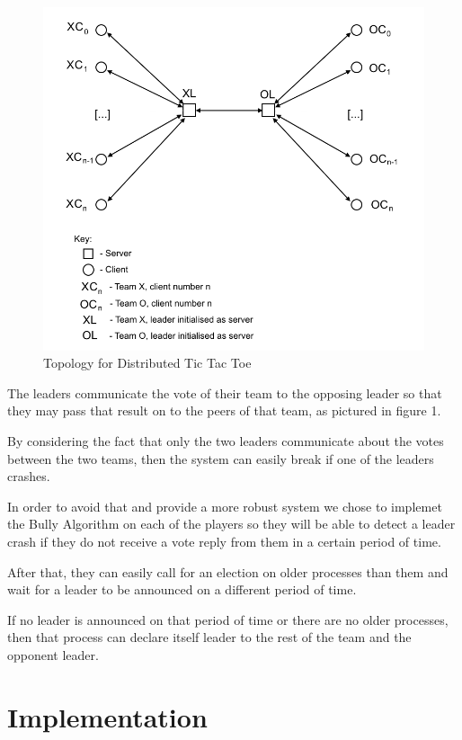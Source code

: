 \documentclass[conference]{IEEEtran}
\begin{document}
\begin{figure}[h]
	\includegraphics[width=\linewidth]{images/DAS-topology.png}
	\caption{Topology for Distributed Tic Tac Toe}
	\label{fig:topology1}
\end{figure}

The leaders communicate the vote of their team to the opposing leader so that they may pass that result on to the peers of that team, as pictured in figure 1.

By considering the fact that only the two leaders communicate about the votes between the two teams, then the system can easily break if one of the leaders crashes. 

In order to avoid that and provide a more robust system we chose to implemet the Bully Algorithm on each of the players so they will be able to detect a leader crash if they do not receive a vote reply from them in a certain period of time.

After that, they can easily call for an election on older processes than them and wait for a leader to be announced on a different period of time.

If no leader is announced on that period of time or there are no older processes, then that process can declare itself leader to the rest of the team and the opponent leader.

\section{Implementation}
\end{document}
